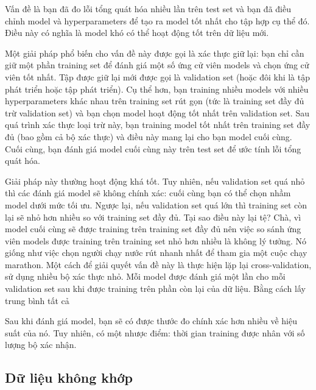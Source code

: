 Vấn đề là bạn đã đo lỗi tổng quát hóa nhiều lần trên test set và bạn đã điều chỉnh model và hyperparameters để tạo ra model tốt nhất cho tập hợp cụ thể đó. Điều này có nghĩa là model khó có thể hoạt động tốt trên dữ liệu mới.

Một giải pháp phổ biến cho vấn đề này được gọi là xác thực giữ lại: bạn chỉ cần giữ một phần training set để đánh giá một số ứng cử viên models và chọn ứng cử viên tốt nhất. Tập được giữ lại mới được gọi là validation set (hoặc đôi khi là tập phát triển hoặc tập phát triển). Cụ thể hơn, bạn training nhiều models với nhiều hyperparameters khác nhau trên training set rút gọn (tức là training set đầy đủ trừ validation set) và bạn chọn model hoạt động tốt nhất trên validation set. Sau quá trình xác thực loại trừ này, bạn training model tốt nhất trên training set đầy đủ (bao gồm cả bộ xác thực) và điều này mang lại cho bạn model cuối cùng. Cuối cùng, bạn đánh giá model cuối cùng này trên test set để ước tính lỗi tổng quát hóa.

Giải pháp này thường hoạt động khá tốt. Tuy nhiên, nếu validation set quá nhỏ thì các đánh giá model sẽ không chính xác: cuối cùng bạn có thể chọn nhầm model dưới mức tối ưu. Ngược lại, nếu validation set quá lớn thì training set còn lại sẽ nhỏ hơn nhiều so với training set đầy đủ. Tại sao điều này lại tệ? Chà, vì model cuối cùng sẽ được training trên training set đầy đủ nên việc so sánh ứng viên models được training trên training set nhỏ hơn nhiều là không lý tưởng. Nó giống như việc chọn người chạy nước rút nhanh nhất để tham gia một cuộc chạy marathon. Một cách để giải quyết vấn đề này là thực hiện lặp lại cross-validation, sử dụng nhiều bộ xác thực nhỏ. Mỗi model được đánh giá một lần cho mỗi validation set sau khi được training trên phần còn lại của dữ liệu. Bằng cách lấy trung bình tất cả

Sau khi đánh giá model, bạn sẽ có được thước đo chính xác hơn nhiều về hiệu suất của nó. Tuy nhiên, có một nhược điểm: thời gian training được nhân với số lượng bộ xác nhận.

\subsection{Dữ liệu không khớp}

